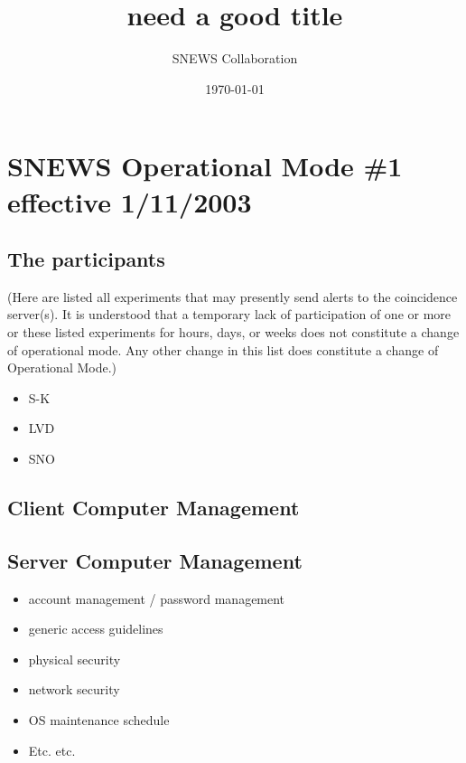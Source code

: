 \documentclass{article}
\begin{document}
\title{need a good title}         
\author{SNEWS Collaboration}
\date{\today}
\maketitle

\section{SNEWS Operational Mode \#1 effective 1/11/2003}

\subsection{The participants}
	(Here are listed all experiments that may presently send
alerts to the coincidence server(s).  It is understood that a
temporary lack of participation of one or more or these listed
experiments for hours, days, or weeks does not constitute a
change of operational mode.  Any other change in this list
does constitute a change of Operational Mode.)
\begin{itemize}
\item S-K
\item LVD
\item SNO
\end{itemize}

\subsection{Client Computer Management}


\subsection{Server Computer Management}
\begin{itemize}
\item account management / password management
\item generic access guidelines
\item physical security
\item network security
\item OS maintenance schedule
\item Etc. etc.
\end{itemize}
\end{document}
